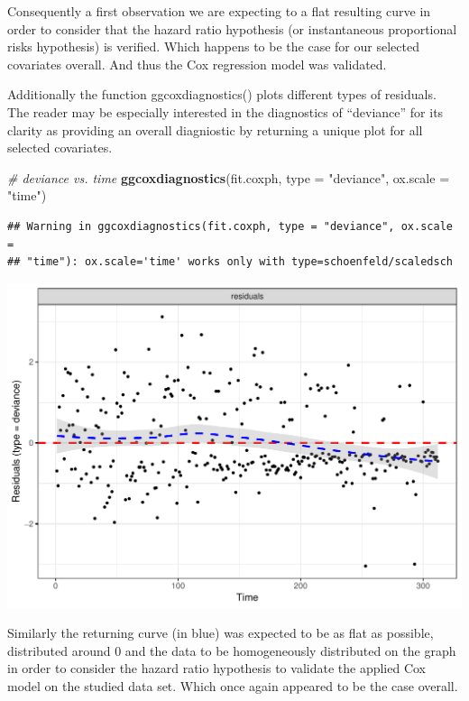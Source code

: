 \documentclass[]{article}
\newenvironment{Shaded}{\begin{snugshade}}{\end{snugshade}}
\newcommand{\KeywordTok}[1]{\textcolor[rgb]{0.13,0.29,0.53}{\textbf{#1}}}
\newcommand{\DataTypeTok}[1]{\textcolor[rgb]{0.13,0.29,0.53}{#1}}
\newcommand{\StringTok}[1]{\textcolor[rgb]{0.31,0.60,0.02}{#1}}
\newcommand{\CommentTok}[1]{\textcolor[rgb]{0.56,0.35,0.01}{\textit{#1}}}
\newcommand{\NormalTok}[1]{#1}
\begin{document}
Consequently a first observation we are expecting to a flat resulting
curve in order to consider that the hazard ratio hypothesis (or
instantaneous proportional risks hypothesis) is verified. Which happens
to be the case for our selected covariates overall. And thus the Cox
regression model was validated.

Additionally the function ggcoxdiagnostics() plots different types of
residuals. The reader may be especially interested in the diagnostics of
``deviance'' for its clarity as providing an overall diagniostic by
returning a unique plot for all selected covariates.

\begin{Shaded}
\begin{Highlighting}[]
\CommentTok{# deviance vs. time}
\KeywordTok{ggcoxdiagnostics}\NormalTok{(fit.coxph, }\DataTypeTok{type =} \StringTok{"deviance"}\NormalTok{, }\DataTypeTok{ox.scale =} \StringTok{"time"}\NormalTok{)}
\end{Highlighting}
\end{Shaded}

\begin{verbatim}
## Warning in ggcoxdiagnostics(fit.coxph, type = "deviance", ox.scale =
## "time"): ox.scale='time' works only with type=schoenfeld/scaledsch
\end{verbatim}

\includegraphics{survival_pbc_files/figure-latex/unnamed-chunk-38-1.pdf}

Similarly the returning curve (in blue) was expected to be as flat as
possible, distributed around 0 and the data to be homogeneously
distributed on the graph in order to consider the hazard ratio
hypothesis to validate the applied Cox model on the studied data set.
Which once again appeared to be the case overall.
\end{document}
